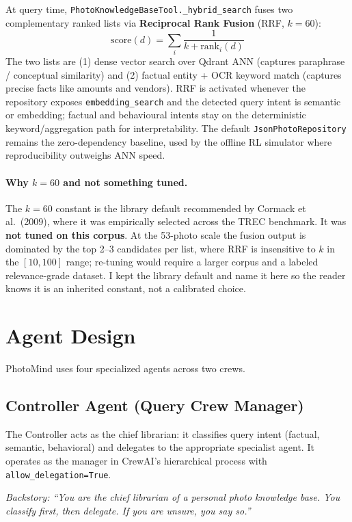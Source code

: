 \documentclass[11pt,letterpaper]{article}
\begin{document}
At query time, \texttt{PhotoKnowledgeBaseTool.\_hybrid\_search} fuses two complementary ranked lists via \textbf{Reciprocal Rank Fusion} (RRF, $k=60$):
\[
\mathrm{score}(d) = \sum_{i} \frac{1}{k + \mathrm{rank}_i(d)}
\]
The two lists are (1) dense vector search over Qdrant ANN (captures paraphrase / conceptual similarity) and (2) factual entity + OCR keyword match (captures precise facts like amounts and vendors). RRF is activated whenever the repository exposes \texttt{embedding\_search} and the detected query intent is semantic or embedding; factual and behavioural intents stay on the deterministic keyword/aggregation path for interpretability. The default \texttt{JsonPhotoRepository} remains the zero-dependency baseline, used by the offline RL simulator where reproducibility outweighs ANN speed.

\paragraph{Why $k=60$ and not something tuned.} The $k=60$ constant is the library default recommended by Cormack et al.\ (2009), where it was empirically selected across the TREC benchmark. It was \textbf{not tuned on this corpus}. At the 53-photo scale the fusion output is dominated by the top 2--3 candidates per list, where RRF is insensitive to $k$ in the $[10, 100]$ range; re-tuning would require a larger corpus and a labeled relevance-grade dataset. I kept the library default and name it here so the reader knows it is an inherited constant, not a calibrated choice.

\section{Agent Design}
\label{sec:agents}

PhotoMind uses four specialized agents across two crews.

\subsection{Controller Agent (Query Crew Manager)}

The Controller acts as the chief librarian: it classifies query intent (factual, semantic, behavioral) and delegates to the appropriate specialist agent. It operates as the manager in CrewAI's hierarchical process with \texttt{allow\_delegation=True}.

\textit{Backstory: ``You are the chief librarian of a personal photo knowledge base. You classify first, then delegate. If you are unsure, you say so.''}
\end{document}
